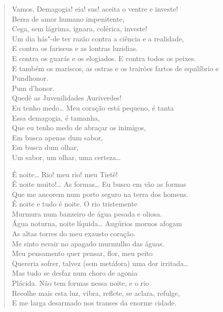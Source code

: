 {\begin{verse}
Vamos, Demagogia! eia! sus! aceita o ventre e investe!\\
Berra de amor humano impenitente,\\
Cega, sem lágrima, ignara, colérica, investe!\\
Um dia hás"-de ter razão contra a ciência e a realidade,\\
E contra os fariseus e as lontras luzidias.\\
E contra os guarás e os elogiados. E contra todos os peixes.\\
E também os mariscos, as ostras e os trairões fartos de equilíbrio e\\
Pundhonor.\\
\quad\quad\quad\quad{}Pum d'honor.\\
\hfill{}Quedê as Juvenilidades Auriverdes!\\
Eu tenho medo\ldots{} Meu coração está pequeno, é tanta\\
Essa demagogia, é tamanha,\\
Que eu tenho medo de abraçar os inimigos,\\
Em busca apenas dum sabor,\\
Em busca dum olhar,\\
Um sabor, um olhar, uma certeza\ldots{}

É noite\ldots{} Rio! meu rio! meu Tietê!\\
É noite muito!\ldots{} As formas\ldots{} Eu busco em vão as formas\\
Que me ancorem num porto seguro na terra dos homens.\\
É noite e tudo é noite. O rio tristemente\\
Murmura num banzeiro de água pesada e oliosa.\\
Água noturna, noite líquida\ldots{} Augúrios mornos afogam\\
As altas torres do meu exausto coração.\\
Me sinto esvair no apagado murmulho das águas.\\
Meu pensamento quer pensar, flor, meu peito\\
Quereria sofrer, talvez (sem metáfora) uma dor irritada\ldots{}\\
Mas tudo se desfaz num choro de agonia\\
Plácida. Não tem formas nessa noite, e o rio\\
Recolhe mais esta luz, vibra, reflete, se aclara, refulge,\\
E me larga desarmado nos transes da enorme cidade.


\end{verse}}
